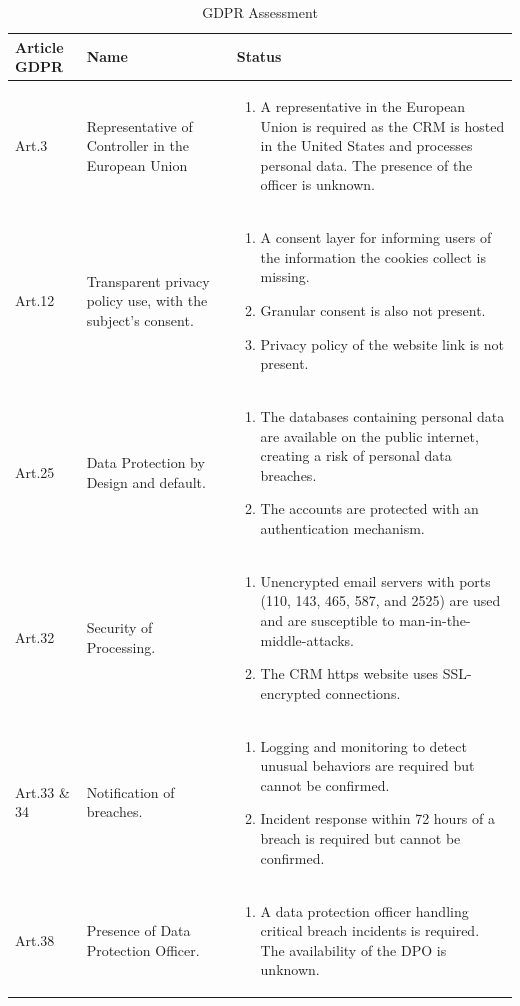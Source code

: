 \newpage
\begingroup
\centering
\setlength{\tabcolsep}{6.5pt} %
\renewcommand{\arraystretch}{1.8} %
\begin{longtable}{ |p{3cm}|p{5cm}| p{7cm} |}
\caption{GDPR Assessment}
    \label{table:gdpr}
\hline
\rowcolor{grey!15}
\textbf{Article GDPR} & \textbf{Name}  & \textbf{Status}\\
\hline
Art.3 & Representative of Controller in the European Union  &  \begin{enumerate}
    \item A representative in the European Union is required as the CRM is hosted in the United States and processes personal data. The presence of the officer is unknown.
\end{enumerate}\\
\hline
Art.12 & Transparent privacy policy use, with the subject's consent.  &  \begin{enumerate}
    \item A consent layer for informing users of the information the cookies collect is missing.
    \item Granular consent is also not present.
    \item Privacy policy of the website link is not present.
\end{enumerate}\\
\hline
Art.25 & Data Protection by Design and default.  &  \begin{enumerate}
    \item The databases containing personal data are available on the public internet, creating a risk of personal data breaches.
    \item The accounts are protected with an authentication mechanism.
\end{enumerate}\\
\hline
Art.32 & Security of Processing.  &  
\begin{enumerate}
    \item Unencrypted email servers with ports (110, 143, 465, 587, and 2525) are used and are susceptible to man-in-the- middle-attacks.
    \item The CRM https website uses SSL-encrypted connections. 
\end{enumerate}\\
\hline
Art.33 \& 34 & Notification of breaches.  &  
\begin{enumerate}
    \item Logging and monitoring to detect unusual behaviors are required but cannot be confirmed.
    \item Incident response within 72 hours of a breach is required but cannot be confirmed.
\end{enumerate}\\
\hline
Art.38 & Presence of Data Protection Officer.  &  
\begin{enumerate}
    \item A data protection officer handling critical breach incidents is required. The availability of the DPO is unknown.
\end{enumerate}\\
\hline
\end{longtable}
\endgroup

